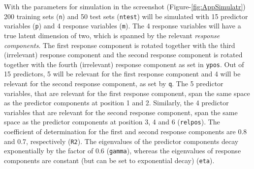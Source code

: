 \documentclass[review]{elsarticle}
\theoremstyle{definition}
\theoremstyle{definition}
\theoremstyle{definition}
\theoremstyle{remark}
\begin{document}
With the parameters for simulation in the screenshot
(Figure-\ref{fig:AppSimulatr}) 200 training sets (\texttt{n}) and 50
test sets (\texttt{ntest}) will be simulated with 15 predictor variables
(\texttt{p}) and 4 response variables (\texttt{m}). The 4 response
variables will have a true latent dimension of two, which is spanned by
the relevant \emph{response components}. The first response component is
rotated together with the third (irrelevant) response component and the
second response component is rotated together with the fourth
(irrelevant) response component as set in \texttt{ypos}. Out of 15
predictors, 5 will be relevant for the first response component and 4
will be relevant for the second response component, as set by
\texttt{q}. The 5 predictor variables, that are relevant for the first
response component, span the same space as the predictor components at
position 1 and 2. Similarly, the 4 predictor variables that are relevant
for the second response component, span the same space as the predictor
components at position 3, 4 and 6 (\texttt{relpos}). The coefficient of
determination for the first and second response components are 0.8 and
0.7, respectively (\texttt{R2}). The eigenvalues of the predictor
components decay exponentially by the factor of 0.6 (\texttt{gamma}),
whereas the eigenvalues of response components are constant (but can be
set to exponential decay) (\texttt{eta}).
\end{document}
